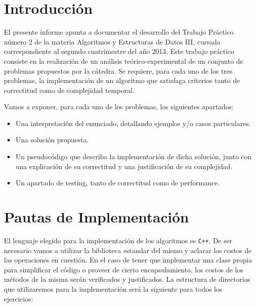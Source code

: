 \documentclass[10pt,a4paper]{article}
\begin{document}

\fecha{\today}



\maketitle


\tableofcontents

\newpage
\section{Introducción}
El presente informe apunta a documentar el desarrollo del Trabajo Práctico número 2 de la materia Algoritmos y Estructuras de Datos III, cursada correspondiente al segundo cuatrimestre del año 2013. Este trabajo pr\'actico consiste en la realización de un análisis teórico-experimental de un conjunto de problemas propuestos por la cátedra. Se requiere, para cada uno de los tres problemas, la implementación de un algoritmo que satisfaga criterios tanto de correctitud como de complejidad temporal.

Vamos a exponer, para cada uno de los problemas, los siguientes apartados:

\begin{itemize}
\item Una interpretación del enunciado, detallando ejemplos y/o casos particulares.
\item Una solución propuesta.
\item Un pseudocódigo que describa la implementación de dicha solución, junto con una explicación de su correctitud y una justificación de su complejidad.
\item Un apartado de testing, tanto de correctitud como de performance.
\end{itemize}


\newpage
\section{Pautas de Implementación}
El lenguaje elegido para la implementación de los algoritmos es \texttt{C++}. De ser necesario vamos a utilizar la biblioteca estandar del mismo y aclarar los costos de las operaciones en cuestión. En el caso de tener que implementar una clase propia para simplificar el código o proveer de cierto encapsulamiento, los costos de los métodos de la misma serán verificados y justificados. La estructura de directorios que utilizaremos para la implementación será la siguiente para todos los ejercicios:
\end{document}
